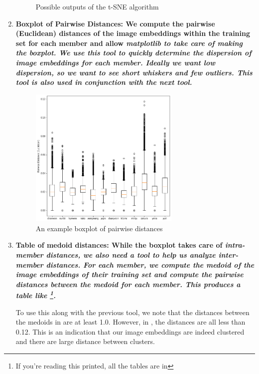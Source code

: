 \begin{enumerate}
\begin{figure}[htbp]
        \caption{Possible outputs of the t-SNE algorithm}
        \label{Figure:Face-Recognition:method:tsne-example}
    \end{figure}

    \item \bf{Boxplot of Pairwise Distances}:
    We compute the pairwise (Euclidean) distances of the image embeddings within the training set for each member and allow \it{matplotlib} to take care of making the boxplot.
    We use this tool to quickly determine the dispersion of image embeddings for each member.
    Ideally we want low dispersion, so we want to see short whiskers and few outliers.
    This tool is also used in conjunction with the next tool.

    \begin{figure}[htbp]
        \centering
        \includegraphics[width=0.68\textwidth]{images/faceReco/boxplot-example.png}
        \caption{An example boxplot of pairwise distances}
        \label{Figure:Face-Recognition:method:boxplot-example}
    \end{figure}
    
    \item \bf{Table of medoid distances}:
    While the boxplot takes care of \it{intra}-member distances, we also need a tool to help us analyze \it{inter}-member distances.
    For each member, we compute the medoid of the image embeddings of their training set and compute the pairwise distances between the medoid for each member.
    This produces a table like \footnote{If you're reading this printed, all the tables are in }.

    To use this along with the previous tool, we note that the distances between the medoids in  are at least 1.0.
    However, in , the distances are all less than 0.12.
    This is an indication that our image embeddings are indeed clustered and there are large distance between clusters. 

\end{enumerate}

